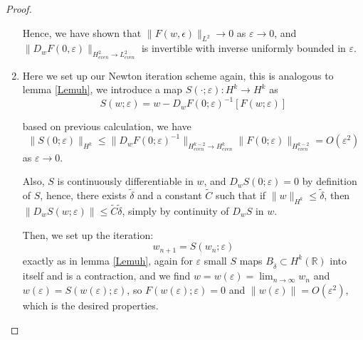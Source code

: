\documentclass[letterpaper,11pt]{article}
\newcommand{\R}{\mathbb{R}}
\newcommand{\eps}{\varepsilon}
\numberwithin{equation}{section}
\theoremstyle{plain}
\begin{document}
\begin{proof}
\begin{enumerate}
Hence, we have shown that $\|F(w,\epsilon)\|_{L^2} \to 0$ as $\eps \to 0$, and $\|D_wF(0,\eps)\|_{H^2_{even} \to L^2_{even}}$ is invertible with inverse uniformly bounded in $\eps$.
\fi
\item Here we set up our Newton iteration scheme again, this is analogous to lemma \ref{Lemuh}, we introduce a map $S(\cdot; \eps) : H^k \to H^{k}$ as
\[
S(w;\eps) = w - D_wF(0; \eps)^{-1}[F(w;\eps)]
\]

based on previous calculation, we have 
\[
\|S(0;\eps)\|_{H^k} \le \|D_wF(0;\eps)^{-1}\|_{H^{k-2}_{even} \to H^k_{even}}\|F(0;\eps)\|_{H^{k-2}_{even}} = O(\eps^2)
\]
as $\eps \to 0$.

Also, $S$ is continuously differentiable in $w$, and $D_wS(0;\eps) = 0$ by definition of $S$, hence, there exists $\tilde{\delta}$ and a constant $\tilde{C}$ such that if $\|w\|_{H^k} \le \tilde{\delta}$, then $\| D_wS(w;\eps) \| \le \tilde{C}\tilde{\delta}$, simply by continuity of $D_wS$ in $w$.

Then, we set up the iteration:
\[
w_{n+1} = S(w_n;\eps)
\]
exactly as in lemma \ref{Lemuh}, again for $\eps$ small $S$ maps $B_{\tilde{\delta}}\subset H^k(\R)$ into itself and is a contraction, and we find $w=w(\eps) = \lim_{n\to \infty} w_n$ and $w(\eps) = S(w(\eps);\eps)$, so $F(w(\eps);\eps) = 0$ and $\|w(\eps)\| = O(\eps^2)$, which is the desired properties.
\end{enumerate}

\end{proof}
\end{document}
